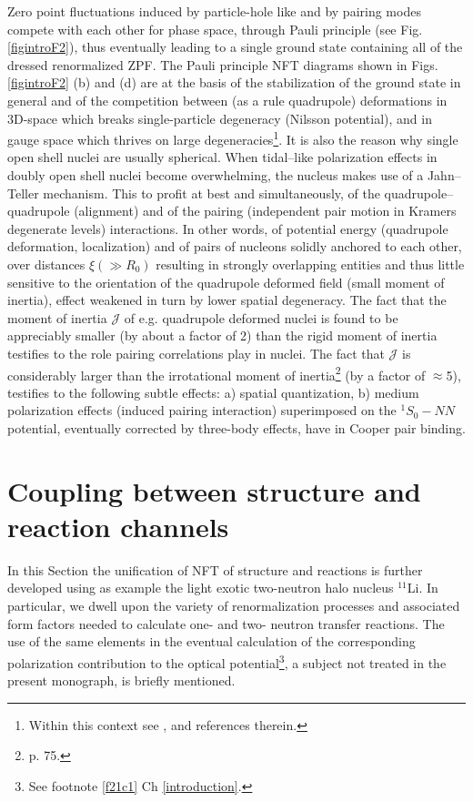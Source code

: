 Zero point fluctuations induced by particle-hole like and by pairing modes compete with each other for phase space, through Pauli principle (see Fig. \ref{figintroF2}), thus eventually leading to a single ground state containing all of the dressed renormalized ZPF. The Pauli principle NFT diagrams shown in Figs. \ref{figintroF2} (b) and (d) are at the basis of the stabilization of the ground state in general and of the competition between (as a rule quadrupole) deformations in 3D-space which breaks single-particle degeneracy (Nilsson potential), and in gauge space which thrives on large degeneracies\footnote{Within this context see \cite{Bayman:61,Bes:69,Mottelson:62,Bohr:75}, and references therein.}. It is also the reason why single open shell nuclei are usually spherical. When tidal--like polarization effects in doubly open shell nuclei become overwhelming, the nucleus makes use of a Jahn--Teller mechanism. This to profit at best and simultaneously, of the quadrupole--quadrupole (alignment) and of the pairing (independent pair motion in Kramers degenerate levels) interactions. In other words, of potential energy (quadrupole deformation, localization) and of pairs of nucleons solidly anchored to each other, over distances $\xi (\gg R_0)$ resulting in strongly overlapping entities and thus little sensitive to the orientation of the quadrupole deformed field (small moment of inertia), effect weakened in turn by  lower spatial degeneracy. The fact that the moment of inertia $\mathcal J$ of e.g. quadrupole deformed nuclei is found to be appreciably smaller (by about a factor of 2) than the rigid moment of inertia testifies to the role pairing correlations play in nuclei. The fact that $\mathcal J$ is considerably larger than the irrotational moment of inertia\footnote{\cite{Bohr:75} p. 75.} (by a factor of $\approx$5), testifies to the following subtle effects: a)  spatial quantization, b) medium polarization effects (induced pairing interaction) superimposed on the $^1S_0-NN$ potential, eventually corrected by  three-body effects, have in Cooper pair binding.
\clearpage

\section[Coupling between structure and reactions]{Coupling between structure and reaction channels}\label{C1S9}
In this Section the unification of NFT of structure and reactions is further developed using as example the light exotic two-neutron halo nucleus $^{11}$Li. In particular, we dwell upon the variety of renormalization processes and associated form factors needed to calculate one- and two- neutron transfer reactions. The use of the same elements in the eventual calculation of the corresponding polarization contribution to the optical potential\footnote{\label{footnoteOM}See footnote \ref{f21c1} Ch \ref{introduction}.}, a subject not treated in the present monograph, is briefly mentioned.  
